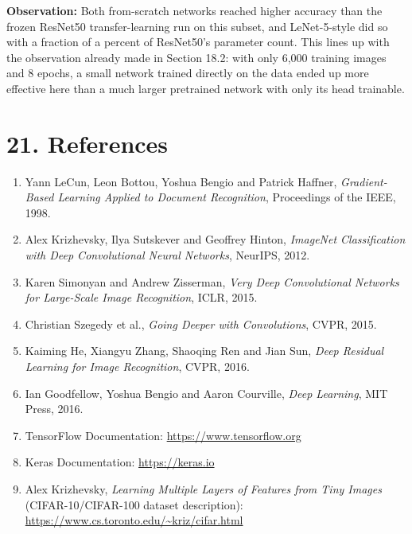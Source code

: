 \documentclass[11pt]{article}
\begin{document}
\textbf{Observation:} Both from-scratch networks reached higher accuracy
than the frozen ResNet50 transfer-learning run on this subset, and
LeNet-5-style did so with a fraction of a percent of ResNet50's parameter
count. This lines up with the observation already made in Section 18.2:
with only 6,000 training images and 8 epochs, a small network trained
directly on the data ended up more effective here than a much larger
pretrained network with only its head trainable.


\section*{21. References}

\begin{enumerate}

\item Yann LeCun, Leon Bottou, Yoshua Bengio and Patrick Haffner,
\emph{Gradient-Based Learning Applied to Document Recognition},
Proceedings of the IEEE, 1998.

\item Alex Krizhevsky, Ilya Sutskever and Geoffrey Hinton,
\emph{ImageNet Classification with Deep Convolutional Neural Networks},
NeurIPS, 2012.

\item Karen Simonyan and Andrew Zisserman,
\emph{Very Deep Convolutional Networks for Large-Scale Image Recognition},
ICLR, 2015.

\item Christian Szegedy et al.,
\emph{Going Deeper with Convolutions},
CVPR, 2015.

\item Kaiming He, Xiangyu Zhang, Shaoqing Ren and Jian Sun,
\emph{Deep Residual Learning for Image Recognition},
CVPR, 2016.

\item Ian Goodfellow, Yoshua Bengio and Aaron Courville,
\emph{Deep Learning},
MIT Press, 2016.

\item TensorFlow Documentation:
\url{https://www.tensorflow.org}

\item Keras Documentation:
\url{https://keras.io}

\item Alex Krizhevsky, \emph{Learning Multiple Layers of Features from
Tiny Images} (CIFAR-10/CIFAR-100 dataset description):
\url{https://www.cs.toronto.edu/~kriz/cifar.html}

\end{enumerate}

\end{document}
